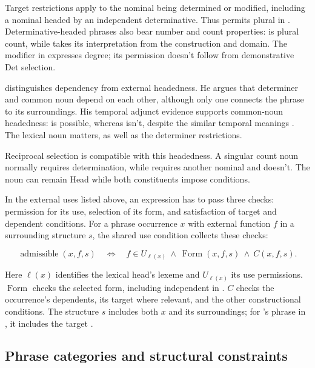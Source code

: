 Target restrictions apply to the nominal being determined or modified, including a nominal headed by an independent determinative. Thus  permits plural  in . Determinative-headed phrases also bear number and count properties:  is plural count, while  takes its interpretation from the construction and domain. The modifier  in  expresses degree; its permission doesn't follow from demonstrative Det selection.

\textcite[7--8]{hudson2004determiners} distinguishes dependency from external headedness. He argues that determiner and common noun depend on each other, although only one connects the phrase to its surroundings. His temporal adjunct evidence supports common-noun headedness:  is possible, whereas  isn't, despite the similar temporal meanings \citep[10--12]{hudson2004determiners}. The lexical noun matters, as well as the determiner restrictions.

Reciprocal selection is compatible with this headedness. A singular count noun normally requires determination, while  requires another nominal and  doesn't. The noun can remain Head while both constituents impose conditions.

In the external uses listed above, an expression has to pass three checks: permission for its use, selection of its form, and satisfaction of target and dependent conditions. For a phrase occurrence $x$ with external function $f$ in a surrounding structure $s$, the shared use condition collects these checks:

\[
\operatorname{admissible}(x,f,s)
\quad\Longleftrightarrow\quad
f\in U_{\ell(x)}\ \land\ \operatorname{Form}(x,f,s)\ \land\ C(x,f,s).
\]

Here $\ell(x)$ identifies the lexical head's lexeme and $U_{\ell(x)}$ its use permissions. $\operatorname{Form}$ checks the selected form, including independent  in . $C$ checks the occurrence's dependents, its target where relevant, and the other constructional conditions. The structure $s$ includes both $x$ and its surroundings; for 's phrase in , it includes the target .

\subsection{Phrase categories and structural constraints}\label{sec:det-uniform}

